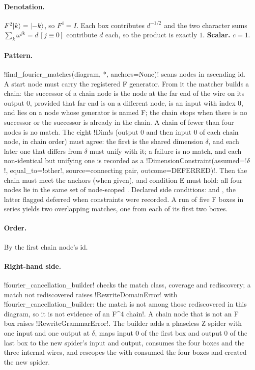 \paragraph{Denotation.} $F^2\lvert k \rangle=\lvert -k \rangle$, so $F^4=I$. Each box contributes $d^{-1/2}$ and the two character sums $\sum_k\omega^{jk}=d\,[j\equiv0]$ contribute $d$ each, so the product is exactly $1$. \textbf{Scalar.} $c=1$.

\paragraph{Pattern.} \py!find_fourier_matches(diagram, *, anchors=None)! scans nodes in ascending id. A start node must carry the registered F generator. From it the matcher builds a chain: the successor of a chain node is the node at the far end of the wire on its output 0, provided that far end is on a different node, is an input with index 0, and lies on a node whose generator is named F; the chain stops when there is no successor or the successor is already in the chain. A chain of fewer than four nodes is no match. The eight \py!Dim!s (output 0 and then input 0 of each chain node, in chain order) must agree: the first is the shared dimension $\delta$, and each later one that differs from $\delta$ must unify with it; a failure is no match, and each non-identical but unifying one is recorded as a \py!DimensionConstraint(assumed=!$\delta$\py!, equal_to=!other\py!, source=connecting pair, outcome=DEFERRED)!. Then the chain must meet the anchors (when given), and condition E must hold: all four nodes lie in the same set of node-scoped \bboxes{}. Declared side conditions:  and , the latter flagged deferred when constraints were recorded. A run of five F boxes in series yields two overlapping matches, one from each of its first two boxes.

\paragraph{Order.} By the first chain node's id.

\paragraph{Right-hand side.} \py!fourier_cancellation_builder! checks the match class, coverage and rediscovery; a match not rediscovered raises \py!RewriteDomainError! with \code!fourier_cancellation_builder: the match is not among those rediscovered in this diagram, so it is not evidence of an F^4 chain!. A chain node that is not an F box raises \py!RewriteGrammarError!. The builder adds a phaseless Z spider with one input and one output at $\delta$, maps input 0 of the first box and output 0 of the last box to the new spider's input and output, consumes the four boxes and the three internal wires, and rescopes the \bboxes{} with consumed the four boxes and created the new spider.

